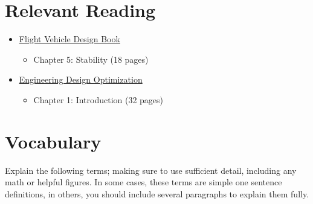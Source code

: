 \documentclass[11pt,twocolumn]{article}
\begin{document}
	
	
	
\section*{Relevant Reading}
\label{sec:reading}

\begin{itemize}
	\item \href{http://flowlab.groups.et.byu.net/me415/flight.pdf}{Flight Vehicle Design Book}
	\begin{itemize}
		\item Chapter 5: Stability (18 pages)
	\end{itemize}
	\item \href{http://flowlab.groups.et.byu.net/mdobook.pdf}{Engineering Design Optimization} 
	\begin{itemize}
		\item Chapter 1: Introduction (32 pages)
	\end{itemize}
\end{itemize}



\section{Vocabulary}
\label{sec:vocab}

Explain the following terms; making sure to use sufficient detail, including any math or helpful figures.
In some cases, these terms are simple one sentence definitions, in others, you should include several paragraphs to explain them fully.
\end{document}
